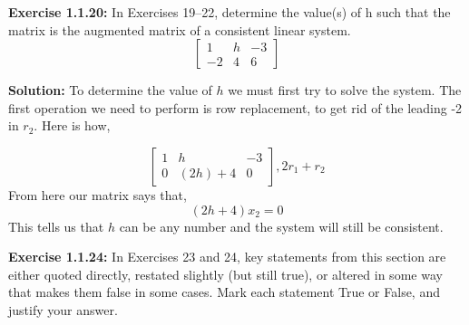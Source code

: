 \documentclass{amsart}
\begin{document}
\vspace{1in}






\noindent\textbf{Exercise 1.1.20: } In Exercises 19–22, determine the value(s) of h such that the matrix is the augmented matrix of a consistent linear system. 
\begin{equation}
\begin{bmatrix} 
1&h&-3\\
-2&4&6
\end{bmatrix}
\end{equation}

\noindent \textbf{Solution: }
To determine the value of $h$ we must first try to solve the system. The first operation we need to perform is row replacement, to get rid of the leading -2 in $r_2$. Here is how,

\begin{equation}
\begin{bmatrix} 
1&h&-3\\
0&(2h)+4&0
\end{bmatrix}, 2r_1+r_2
\end{equation}
From here our matrix says that,
\begin{equation}
(2h+4)x_2=0
\end{equation}
This tells us that $h$ can be any number and the system will still be consistent.



\vspace{1in}














\noindent\textbf{Exercise 1.1.24: } In Exercises 23 and 24, key statements from this section are either quoted directly, restated slightly (but still true), or altered in some way that makes them false in some cases. Mark each statement True or False, and justify your answer. \\
\end{document}
